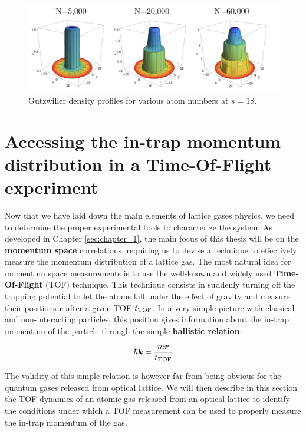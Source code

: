 \begin{figure}
    \centering
    \includegraphics[width=\textwidth]{Fig/Chapter2/wedding_cake_gutzwiller.png}
    \caption[2D Gutzwiller density profiles for various atom numbers at $s=18$]{Gutzwiller density profiles for various atom numbers at $s=18$.}
    \label{fig:wedding_cake_gutzwiller}
\end{figure}


\section{Accessing the in-trap momentum distribution in a Time-Of-Flight experiment}

\label{sec:ch2_TOF}

Now that we have laid down the main elements of lattice gases physics, we need to determine the proper experimental tools to characterize the system. As developed in Chapter \ref{sec:chapter_1}, the main focus of this thesis will be on the \textbf{momentum space} correlations, requiring us to devise a technique to effectively measure the momentum distribution of a lattice gas. The most natural idea for momentum space measurements is to use the well-known and widely used \textbf{Time-Of-Flight} (TOF) technique. This technique consists in suddenly turning off the trapping potential to let the atoms fall under the effect of gravity and measure their positions $\bm{r}$ after a given TOF $t_{\rm{TOF}}$. In a very simple picture with classical and non-interacting particles, this position gives information about the in-trap momentum of the particle through the simple \textbf{ballistic relation}:

\begin{equation}
    \hbar \bm{k} = \frac{m \bm{r}}{t_{\rm{TOF}}}
\end{equation}

The validity of this simple relation is however far from being obvious for the quantum gases released from optical lattice. We will then describe in this section the TOF dynamics of an atomic gas released from an optical lattice to identify the conditions under which a TOF measurement can be used to properly measure the in-trap momentum of the gas.

